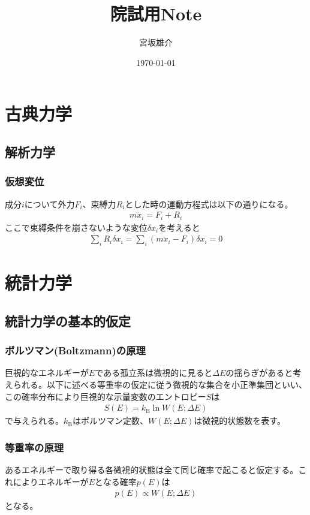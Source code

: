 \documentclass[a4paper,12pt, oneside, openany]{jsbook}
\title{院試用Note}
\date{\today}
\author{宮坂雄介\\}
\begin{document}
\maketitle
\thispagestyle{empty}
\mbox{}\newpage
\newpage
\setcounter{tocdepth}{2}
\tableofcontents

\newpage
{}
\setcounter{page}{1}


\newpage
\chapter{古典力学}
\section{解析力学}
\subsection{仮想変位}
成分$i$について外力$F_{i}$、束縛力$R_{i}$とした時の運動方程式は以下の通りになる。
\begin{eqnarray}
  m\ddot{x}_{i}=F_{i}+R_{i}
\end{eqnarray}
ここで束縛条件を崩さないような変位$\delta x_{i}$を考えると
\begin{eqnarray}
  \sum_{i}R_{i}\delta x_{i}=\sum_{i}(m\ddot{x}_{i}-F_{i})\delta x_{i}=0
\end{eqnarray}

\newpage
\chapter{統計力学}

\section{統計力学の基本的仮定}
\subsection{ボルツマン(Boltzmann)の原理}
巨視的なエネルギーが$E$である孤立系は微視的に見ると$\Delta E$の揺らぎがあると考えられる。以下に述べる等重率の仮定に従う微視的な集合を小正準集団といい、この確率分布により巨視的な示量変数のエントロピー$S$は
\begin{eqnarray}
  \label{boltzmann}
  S(E) = k_{\text{B}} \ln W(E;\Delta E)
\end{eqnarray}
で与えられる。$k_{\text{B}}$はボルツマン定数、$W(E;\Delta E)$は微視的状態数を表す。
\subsection{等重率の原理}
あるエネルギーで取り得る各微視的状態は全て同じ確率で起こると仮定する。これによりエネルギーが$E$となる確率$p(E)$は
\begin{eqnarray}
  p(E)\propto W(E;\Delta E)
\end{eqnarray}
となる。
\end{document}
